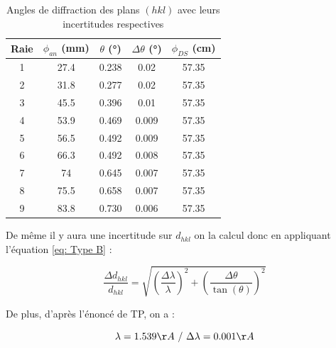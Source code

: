 \begin{table}[h!]
	\centering
	\begin{tabular}{|c|c|c|c|c|}
		
		\hline
Raie	&	$\phi_{an}$ (mm) & $\theta $ (°)	 & $\Delta \theta$ (°) & $\phi_{DS}$ (cm) \\ \hline
1 &	27.4	&           0.238          &    0.02    & 57.35\\ \hline
2 &	31.8	&        0.277              &   0.02     & 57.35\\ \hline
3 &	45.5	&          0.396           &    0.01   & 57.35 \\ \hline
4 &	53.9	&          0.469            &  0.009      & 57.35\\ \hline
 5 &	56.5	&      0.492                 &   0.009   &57.35  \\ \hline
6&	66.3	&            0.492          &     0.008	  & 57.35\\ \hline
7&	74	&               0.645        &     0.007   & 57.35\\ \hline
8&	75.5	&           0.658           &   0.007    & 57.35 \\ \hline
9&	83.8	&            0.730          &   0.006    & 57.35 \\ \hline
	\end{tabular}
	\caption{Angles de diffraction des plans $(h k l)$ avec leurs incertitudes respectives
	 }
	\label{tab:Tableau des angles correspondant aux diffrentes raies en fonction de phi DS}
\end{table}

De même il y aura une incertitude sur $d_{hkl}$ on la calcul donc en appliquant l'équation \ref{eq: Type B} :

\begin{equation} \label{eq: Type B dhkl}
	\frac{\Delta d_{hkl}}{d_{hkl}} = \sqrt{\left ( \frac{\Delta \lambda }{\lambda} \right )^2 + \left ( \frac{\Delta \theta}{\tan(\theta)} \right )^2 }
\end{equation}

De plus, d'après l'énoncé de TP, on a		  :

\begin{equation}
	\lambda = 1.539 \AA \ / \ \Delta \lambda = 0.001 \AA
\end{equation}

